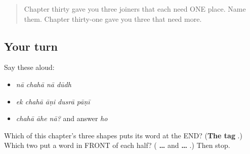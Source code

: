 \label{lesson:MR-R31-pairs}



\begin{quote}
Chapter thirty gave you three joiners that each need ONE place. Name them. Chapter thirty-one gave you three that need more.
\end{quote}

\subsection*{Your turn}
Say these aloud:

\begin{itemize}
\raggedright
  \item \emph{nā chahā nā dūdh}
  \item \emph{ek chahā āṇi dusrā pāṇī}
  \item \emph{chahā āhe nā?} and answer \emph{ho}
\end{itemize}

\begin{tcolorbox}[breakable,colback=teal!4,colframe=teal!35!black,title={Before you move on}]
Which of this chapter's three shapes puts its word at the END? (\textbf{The tag }.) Which two put a word in FRONT of each half? (\textbf{ … } and \textbf{ … }.) Then stop.
\end{tcolorbox}
